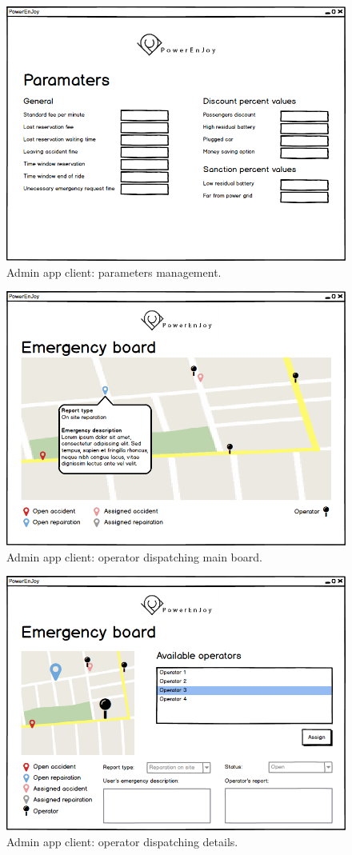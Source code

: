 	\begin{figure}[h]
		\includegraphics[height=0.4\textheight, center]{img/user_interface_design/Admin_parameters.png}
		\caption{Admin app client: parameters management.}
	\end{figure}
	\begin{figure}[h]
		\includegraphics[height=0.4\textheight, center]{img/user_interface_design/Admin_emergency_board.png}
		\caption{Admin app client: operator dispatching main board.}
	\end{figure}
	\begin{figure}[h]
		\includegraphics[height=0.4\textheight, center]{img/user_interface_design/Admin_emergency_detail.png}
		\caption{Admin app client: operator dispatching details.}
	\end{figure}
\FloatBarrier

